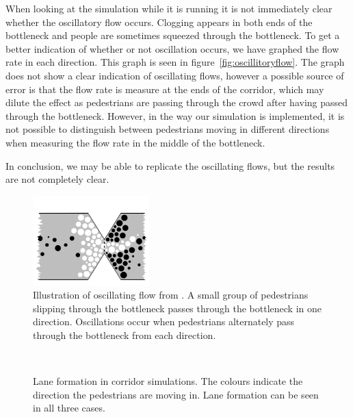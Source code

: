 When looking at the simulation while it is running it is not immediately clear 
whether the oscillatory flow occurs. Clogging appears in both ends of the 
bottleneck and people are sometimes squeezed through the bottleneck. To get a 
better indication of whether or not oscillation occurs, we have graphed the 
flow rate in each direction. This graph is seen in 
figure~\ref{fig:oscillitoryflow}. The graph does not show a clear indication 
of oscillating flows, however a possible source of error is that the flow rate 
is measure at the ends of the corridor, which may dilute the effect as 
pedestrians are passing through the crowd after having passed through the 
bottleneck. However, in the way our simulation is implemented, it is not 
possible to distinguish between pedestrians moving in different directions 
when measuring the flow rate in the middle of the bottleneck.

In conclusion, we may be able to replicate the oscillating flows, but the 
results are not completely clear.
\begin{figure}[h]
    \centering
    \includegraphics[width=0.4\textwidth]{Figures/oscil_flow.png}
    \caption[Illustration of oscillating flow from \cite{oscil}]{Illustration 
    of oscillating flow from \cite{oscil}. A small group of pedestrians 
    slipping through the bottleneck passes through the bottleneck in one 
    direction. Oscillations occur when pedestrians alternately pass through 
    the bottleneck from each direction.}
    \label{fig:oscillitoryflow_litterature}
\end{figure}

\begin{figure}[h]
    \centering
    \\
    
    \caption[Lane formation in corridor simulations]{Lane formation in 
    corridor simulations. The colours indicate the direction the pedestrians 
    are moving in. Lane formation can be seen in all three cases.}
    \label{fig:laneformation}
\end{figure}

